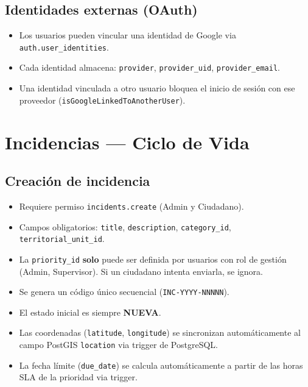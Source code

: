 \documentclass[11pt, a4paper]{article}
\begin{document}
\subsection{Identidades externas (OAuth)}

\begin{itemize}
  \item Los usuarios pueden vincular una identidad de Google via \texttt{auth.user\_identities}.
  \item Cada identidad almacena: \texttt{provider}, \texttt{provider\_uid}, \texttt{provider\_email}.
  \item Una identidad vinculada a otro usuario bloquea el inicio de sesión con ese proveedor (\texttt{isGoogleLinkedToAnotherUser}).
\end{itemize}


\section{Incidencias — Ciclo de Vida}

\subsection{Creación de incidencia}

\begin{reglanegocio}
\begin{itemize}
  \item Requiere permiso \texttt{incidents.create} (Admin y Ciudadano).
  \item Campos obligatorios: \texttt{title}, \texttt{description}, \texttt{category\_id}, \texttt{territorial\_unit\_id}.
  \item La \texttt{priority\_id} \textbf{solo} puede ser definida por usuarios con rol de gestión (Admin, Supervisor). Si un ciudadano intenta enviarla, se ignora.
  \item Se genera un código único secuencial (\texttt{INC-YYYY-NNNNN}).
  \item El estado inicial es siempre \textbf{NUEVA}.
  \item Las coordenadas (\texttt{latitude}, \texttt{longitude}) se sincronizan automáticamente al campo PostGIS \texttt{location} via trigger de PostgreSQL.
  \item La fecha límite (\texttt{due\_date}) se calcula automáticamente a partir de las horas SLA de la prioridad via trigger.
\end{itemize}
\end{reglanegocio}
\end{document}
